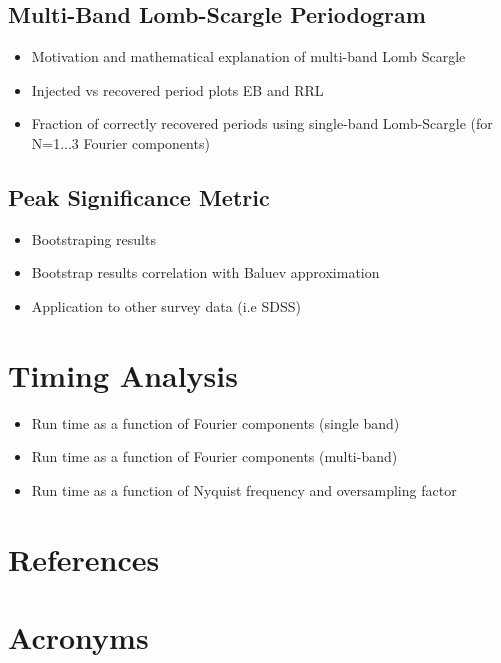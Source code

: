 \documentclass[DM,authoryear,toc]{lsstdoc}
\begin{document}
\subsection{Multi-Band Lomb-Scargle Periodogram}


\begin{itemize}
\item Motivation and mathematical explanation of multi-band Lomb Scargle 
\item Injected vs recovered period plots EB and RRL
\item Fraction of correctly recovered periods using single-band Lomb-Scargle (for N=1...3 Fourier components)  
\end{itemize}


\subsection{Peak Significance Metric}

\begin{itemize}
\item Bootstraping results 
\item Bootstrap results correlation with Baluev approximation
\item Application to other survey data (i.e SDSS)
\end{itemize}


\section{Timing Analysis}

\begin{itemize}
\item Run time as a function of Fourier components (single band)
\item Run time as a function of Fourier components (multi-band)
\item Run time as a function of Nyquist frequency and oversampling factor
\end{itemize}





\appendix
\section{References} \label{sec:bib}
\renewcommand{\refname}{} %


\section{Acronyms} \label{sec:acronyms}

\end{document}
